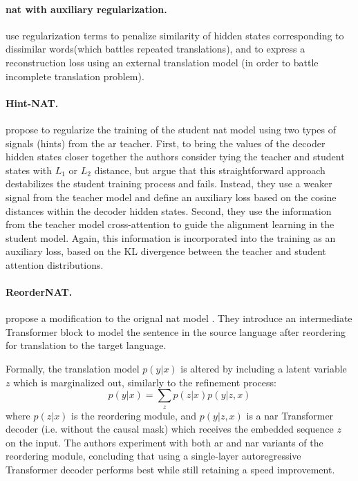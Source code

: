 \paragraph{\Ac{nat} with auxiliary regularization.}
\citet{wang-etal-2019-nonautoregressive} use regularization terms to penalize
similarity of hidden states corresponding to dissimilar words(which battles
repeated translations), and to express a reconstruction loss using an external
translation model (in order to battle incomplete translation
problem). 

\paragraph{Hint-NAT.} \citet{li-etal-2019-hint} propose to regularize the
training of the student \ac{nat} model using two types of signals (hints) from
the \ac{ar} teacher. First, to bring the values of the decoder hidden states
closer together the authors consider tying the teacher and student states with
$L_1$ or $L_2$ distance, but argue that this straightforward approach
destabilizes the student training process and fails. Instead, they use a weaker
signal from the teacher model and define an auxiliary loss based on the cosine
distances within the decoder hidden states. Second, they use the information
from the teacher model cross-attention to guide the alignment learning in the
student model. Again, this information is incorporated into the training as an
auxiliary loss, based on the KL divergence between the teacher and student
attention distributions.

 



\paragraph{ReorderNAT.} \citet{ran-etal-2021-guiding} propose a modification to
the orignal \ac{nat} model \citep{gu2017nonautoregressive}. They introduce an
intermediate Transformer block to model the sentence in the source language
after reordering for translation to the target language.

Formally, the translation model $p(y|x)$ is altered by including a latent
variable $z$ which is marginalized out, similarly to the refinement process:
%
\begin{equation}
  p(y|x) = \sum_{z} p(z|x) p(y|z,x)
\end{equation}
%
where $p(z|x)$ is the reordering module, and $p(y|z,x)$ is a \ac{nar}
Transformer decoder (i.e. without the causal mask) which receives the embedded
sequence $z$ on the input. The authors experiment with both \ac{ar} and
\ac{nar} variants of the reordering module, concluding that using a
single-layer autoregressive Transformer decoder performs best while still
retaining a speed improvement.

